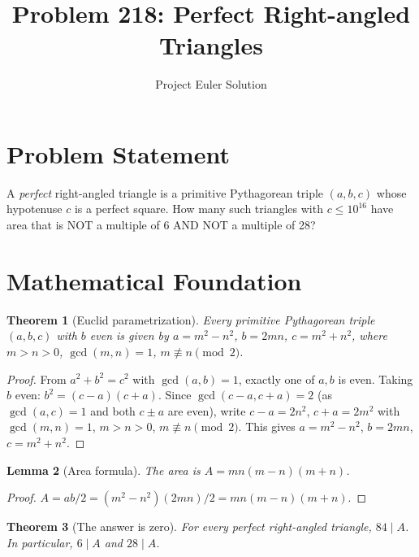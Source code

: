 \documentclass[12pt]{article}
\title{Problem 218: Perfect Right-angled Triangles}
\author{Project Euler Solution}
\date{}
\newtheorem{theorem}{Theorem}
\newtheorem{lemma}[theorem]{Lemma}
\begin{document}
\maketitle

\section{Problem Statement}

A \emph{perfect} right-angled triangle is a primitive Pythagorean triple $(a,b,c)$ whose hypotenuse $c$ is a perfect square. How many such triangles with $c \leq 10^{16}$ have area that is NOT a multiple of 6 AND NOT a multiple of 28?

\section{Mathematical Foundation}

\begin{theorem}[Euclid parametrization]
Every primitive Pythagorean triple $(a,b,c)$ with $b$ even is given by $a = m^2-n^2$, $b = 2mn$, $c = m^2+n^2$, where $m > n > 0$, $\gcd(m,n)=1$, $m \not\equiv n\pmod{2}$.
\end{theorem}

\begin{proof}
From $a^2+b^2 = c^2$ with $\gcd(a,b)=1$, exactly one of $a,b$ is even. Taking $b$ even: $b^2 = (c-a)(c+a)$. Since $\gcd(c-a, c+a) = 2$ (as $\gcd(a,c)=1$ and both $c\pm a$ are even), write $c-a = 2n^2$, $c+a = 2m^2$ with $\gcd(m,n)=1$, $m > n > 0$, $m\not\equiv n\pmod{2}$. This gives $a = m^2-n^2$, $b = 2mn$, $c = m^2+n^2$.
\end{proof}

\begin{lemma}[Area formula]
The area is $A = mn(m-n)(m+n)$.
\end{lemma}

\begin{proof}
$A = ab/2 = (m^2-n^2)(2mn)/2 = mn(m-n)(m+n)$.
\end{proof}

\begin{theorem}[The answer is zero]
For every perfect right-angled triangle, $84 \mid A$. In particular, $6 \mid A$ and $28 \mid A$.
\end{theorem}
\end{document}
